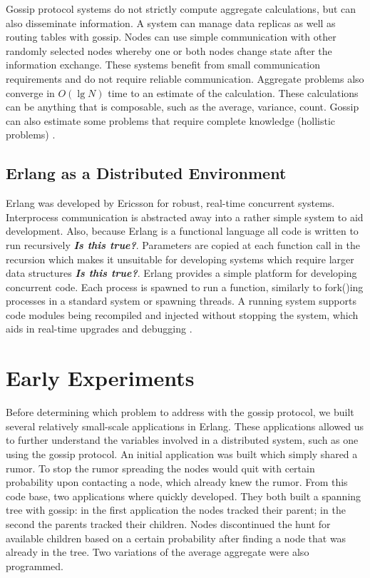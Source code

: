 \documentclass[11pt,twocolumn]{article}
\begin{document}
Gossip protocol systems do not strictly compute aggregate calculations, but can also disseminate information.  A system can manage data replicas as well as routing tables with gossip.  Nodes can use simple communication with other randomly selected nodes whereby one or both nodes change state after the information exchange.  These systems benefit from small communication requirements and do not require reliable communication.  Aggregate problems also converge in $O(\lg N)$ time to an estimate of the calculation.  These calculations can be anything that is composable, such as the average, variance, count.  Gossip can also estimate some problems that require complete knowledge (hollistic problems) \cite{Birm2007}.

\subsection{Erlang as a Distributed Environment}

Erlang was developed by Ericsson for robust, real-time concurrent systems.  Interprocess communication is abstracted away into a rather simple system to aid development.  Also, because Erlang is a functional language all code is written to run recursively {\bf {\em Is this true?}}.  Parameters are copied at each function call in the recursion which makes it unsuitable for developing systems which require larger data structures {\bf {\em Is this true?}}.  Erlang provides a simple platform for developing concurrent code.  Each process is spawned to run a function, similarly to fork()ing processes in a standard system or spawning threads.  A running system supports code modules being recompiled and injected without stopping the system, which aids in real-time upgrades and debugging \cite{Erlang}.

\section{Early Experiments}

Before determining which problem to address with the gossip protocol, we built several relatively small-scale applications in Erlang.  These applications allowed us to further understand the variables involved in a distributed system, such as one using the gossip protocol.  An initial application was built which simply shared a rumor.  To stop the rumor spreading the nodes would quit with certain probability upon contacting a node, which already knew the rumor.  From this code base, two applications where quickly developed.  They both built a spanning tree with gossip: in the first application the nodes tracked their parent; in the second the parents tracked their children.  Nodes discontinued the hunt for available children based on a certain probability after finding a node that was already in the tree.  Two variations of the average aggregate were also programmed.
\end{document}
